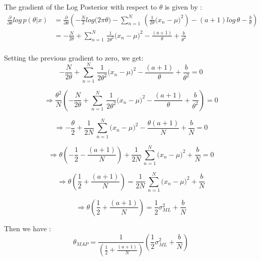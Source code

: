 \documentclass[12pt,twoside]{article}
\begin{document}
The gradient of the Log Posterior with respect to $\theta$ is given by :
\begin{align*}
\frac{\partial}{\partial \theta}log \,p(\theta|x) &= \frac{\partial}{\partial \theta} \left( -\frac{N}{2} log\big(2 \pi \theta\big) - \sum_{n=1}^{N}  \, \left( \frac{1}{2 \theta}\big(x_n - \mu\big)^2 \right) -(a+1)log \, \theta - \frac{b}{\theta}\right) \\
&= -\frac{N}{2 \theta} + \sum_{n=1}^{N}  \, \frac{1}{2 \theta^2}\big(x_n - \mu\big)^2 - \frac{(a+1)}{\theta}  + \frac{b}{\theta^2}\\
\end{align*}

Setting the previous gradient to zero, we get:
\begin{equation*}
-\frac{N}{2 \theta} + \sum_{n=1}^{N}  \, \frac{1}{2 \theta^2}\big(x_n - \mu\big)^2 - \frac{(a+1)}{\theta}  + \frac{b}{\theta^2} = 0
\end{equation*}

\begin{equation*}
\Longrightarrow \frac{\theta^2}{N}\left( -\frac{N}{2 \theta} + \sum_{n=1}^{N}  \, \frac{1}{2 \theta^2}\big(x_n - \mu\big)^2 - \frac{(a+1)}{\theta}  + \frac{b}{\theta^2}\right) = 0
\end{equation*}

\begin{equation*}
\Longrightarrow  -\frac{\theta}{2} + \frac{1}{2N} \,\sum_{n=1}^{N}  \big(x_n - \mu\big)^2 - \frac{\theta(a+1)}{N}  + \frac{b}{N} = 0
\end{equation*}	

\begin{equation*}
\Longrightarrow  \theta \left(-\frac{1}{2} - \frac{(a+1)}{N} \right)  + \frac{1}{2N} \,\sum_{n=1}^{N}  \big(x_n - \mu\big)^2   + \frac{b}{N} = 0
\end{equation*}	

\begin{equation*}
\Longrightarrow  \theta \left(\frac{1}{2} + \frac{(a+1)}{N} \right)  = \frac{1}{2N} \,\sum_{n=1}^{N}  \big(x_n - \mu\big)^2   + \frac{b}{N}
\end{equation*}	

\begin{equation*}
\Longrightarrow  \theta \left(\frac{1}{2} + \frac{(a+1)}{N} \right)  = \frac{1}{2}\sigma_{ML}^2   + \frac{b}{N} 
\end{equation*}	

Then we have :
\begin{equation}
\boxed{\theta_{MAP} = \frac{1}{\left(\frac{1}{2} + \frac{(a+1)}{N} \right)} \left(\frac{1}{2}\sigma_{ML}^2   + \frac{b}{N} \right)}
\end{equation}
\end{document}
